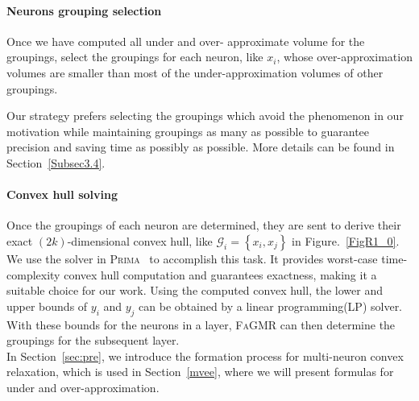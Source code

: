 \documentclass[runningheads]{llncs}
\newcommand{\ourtool}{\textsc{FaGMR}\xspace}
\newcommand{\prima}{\textsc{Prima}\xspace}
\begin{document}
\paragraph{Neurons grouping selection}
Once we have computed all under and over- approximate volume for the groupings,
select the groupings for each neuron, like $x_{i}$, whose over-approximation volumes are smaller than most of the under-approximation volumes of other groupings.

Our strategy prefers selecting the groupings which avoid the phenomenon in our motivation while maintaining groupings as many as possible to guarantee precision and saving time as possibly as possible. More details can be found in Section~\ref{Subsec3.4}.

\paragraph{Convex hull solving}
Once the groupings of each neuron are determined, they are sent to derive their exact $(2k)$-dimensional convex hull,
like $\mathcal{G}_{i}=\left\{x_{i},x_{j}\right\}$ in Figure.~\ref{FigR1_0}.
We use the solver in \prima~\cite{DBLP:journals/pacmpl/MullerMSPV22} to accomplish this task.
It provides worst-case time-complexity convex hull computation
and guarantees exactness, making it a suitable choice
for our work.
Using the computed convex hull, the lower and upper bounds of $y_{i}$ and $y_{j}$
can be obtained by a linear programming(LP) solver.
With these bounds for the neurons in a layer, \ourtool can then determine the groupings for the subsequent layer.\\
In Section~\ref{sec:pre}, we introduce the formation process for multi-neuron convex relaxation, which is used in Section~\ref{mvee}, where we will present formulas for under and over-approximation.
\end{document}
